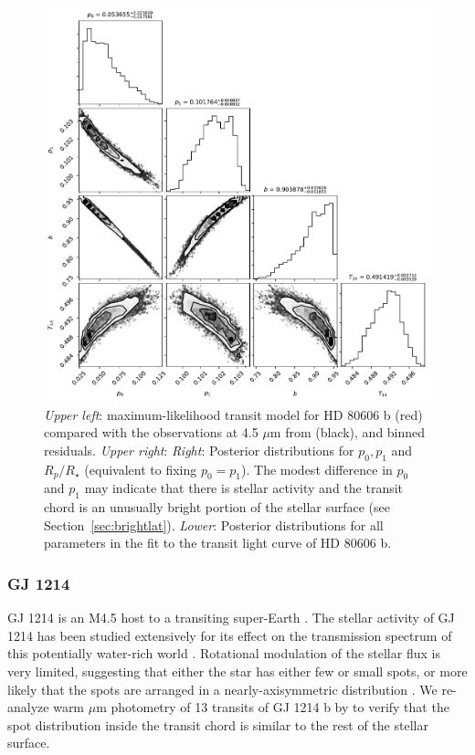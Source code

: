 \begin{figure}
    \includegraphics[scale=0.6]{robin/corner_full_hd80606.pdf}
    \caption{\textsl{Upper left}: maximum-likelihood transit model for HD 80606 b (red) compared with the \spitzer observations at 4.5 $\mu$m from \citet{Hebrard2010} (black), and binned residuals. \textsl{Upper right}: \textsl{Right}: Posterior distributions for $p_0,p_1$ and $R_p/R_\star$ (equivalent to fixing $p_0 = p_1$). The modest difference in $p_0$ and $p_1$ may indicate that there is stellar activity and the transit chord is an unusually bright portion of the stellar surface (see Section~\ref{sec:brightlat}). \textsl{Lower}: Posterior distributions for all parameters in the fit to the transit light curve of HD 80606 b.}
    \label{fig:hd80606}
\end{figure}

\subsubsection{GJ 1214}

GJ 1214 is an M4.5 host to a transiting super-Earth \citep{Charbonneau2009}. The stellar activity of GJ 1214 has been studied extensively for its effect on the transmission spectrum of this potentially water-rich world \citep{Fraine2013}. Rotational modulation of the stellar flux is very limited, suggesting that either the star has either few or small spots, or more likely that the spots are arranged in a nearly-axisymmetric distribution \citep{Berta2011,Narita2013}. We re-analyze warm  $\mu$m photometry of 13 transits of GJ 1214 b by \citet{Gillon2014} to verify that the spot distribution inside the transit chord is similar to the rest of the stellar surface. 

